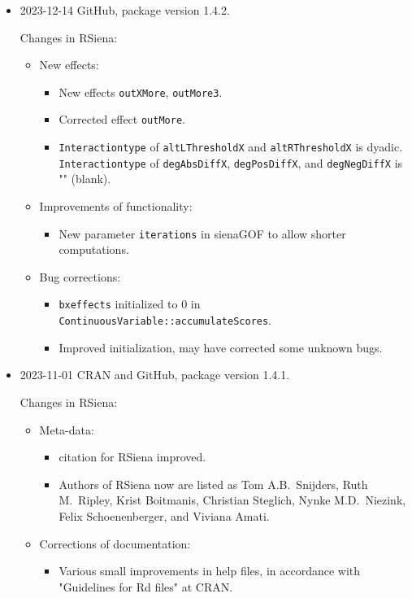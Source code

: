 \documentclass[a4paper,fleqn,11pt]{article}
\newcommand{\+}{\, + \,}
\newcommand{\sfn}[1]{\textsf{#1}}
\newcommand{\RS}{{\sf \textsf{RSiena} }}
\begin{document}
\begin{small}
\begin{itemize}
\item 2023-12-14 GitHub, package version 1.4.2.

Changes in RSiena:
\begin{itemize}
\item New effects:
   \begin{itemize}
   \item New effects \texttt{outXMore}, \texttt{outMore3}.
   \item Corrected effect \texttt{outMore}.
   \item \texttt{Interactiontype} of \texttt{altLThresholdX} and
        \texttt{altRThresholdX} is dyadic.\\
        \texttt{Interactiontype} of \texttt{degAbsDiffX}, \texttt{degPosDiffX},
       and \texttt{degNegDiffX} is "" (blank).
    \end{itemize}
\item Improvements of functionality:
   \begin{itemize}
   \item New parameter \texttt{iterations} in \sfn{sienaGOF} to allow shorter computations.
    \end{itemize}
\item Bug corrections:
   \begin{itemize}
    \item  \texttt{bxeffects} initialized to 0 in \texttt{ContinuousVariable::accumulateScores}.
    \item Improved initialization, may have corrected some unknown bugs.
    \end{itemize}
\end{itemize}

\item 2023-11-01 CRAN and GitHub, package version 1.4.1.


Changes in RSiena:
\begin{itemize}
\item Meta-data:
   \begin{itemize}
   \item \sfn{citation} for \RS improved.
   \item Authors of \RS now are listed as
   Tom A.B.\ Snijders, Ruth M.\ Ripley, Krist Boitmanis, Christian
  Steglich, Nynke M.D.\ Niezink, Felix Schoenenberger, and Viviana
  Amati.
    \end{itemize}
\item Corrections of documentation:
   \begin{itemize}
   \item Various small improvements in help files,
      in accordance with "Guidelines for Rd files" at CRAN.
    \end{itemize}
\end{itemize}


\end{itemize}
\end{small}
\end{document}
